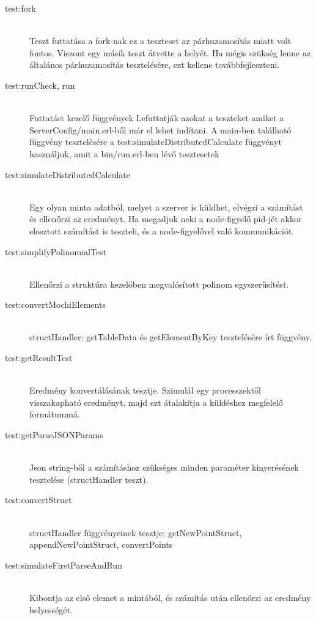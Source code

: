 		\begin{description}
		\item[test:fork] \hfill \\
			Teszt futtatása a fork-nak ez a teszteset az párhuzamosítás miatt volt fontos. Viszont egy másik teszt átvette a helyét.
			\newline
			Ha mégis szükség lenne az általános párhuzamosítás tesztelésére, ezt kellene továbbfejleszteni.

		\item[test:runCheck, run] \hfill \\
			Futtatást kezelő függvények
			Lefuttatják azokat a teszteket amiket a ServerConfig/main.erl-ből már el lehet indítani. 
			A main-ben található függvény tesztelésére a  test:simulateDistributedCalculate függvényt használjuk, amit a bin/run.erl-ben lévő tesztesetek 
		\item[test:simulateDistributedCalculate] \hfill \\
			Egy olyan minta adatból, melyet a szerver is küldhet, elvégzi a számítást és ellenőrzi az eredményt. \newline
			Ha megadjuk neki a node-figyelő pid-jét akkor elosztott számítást is teszteli, és a node-figyelővel való kommunikációt. 
		\item[test:simplifyPolinomialTest] \hfill \\
			Ellenőrzi a struktúra kezelőben megvalósított polinom egyszerűsítést.  
		\item[test:convertMochiElements] \hfill \\
			structHandler: getTableData és getElementByKey tesztelésére írt függvény.
		\item[test:getResultTest] \hfill \\
			Eredmény konvertálásának tesztje. Szimulál egy processzektől visszakapható eredményt, majd ezt átalakítja a küldéshez megfelelő formátummá.
		\item[test:getParseJSONParams] \hfill \\
			Json string-ből a számításhoz szükséges minden paraméter kinyerésének tesztelése (structHandler teszt).
		\item[test:convertStruct] \hfill \\
			structHandler függvényeinek tesztje: 
			getNewPointStruct, appendNewPointStruct, convertPoints
		\item[test:simulateFirstParseAndRun] \hfill \\
			Kibontja az első elemet a mintából, és számítás után ellenőrzi az eredmény helyességét. \newline

\end{description}
